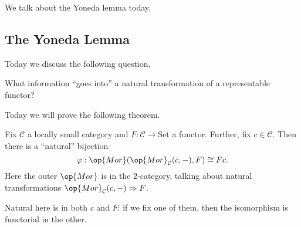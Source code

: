 
We talk about the Yoneda lemma today.

\subsection{The Yoneda Lemma}
Today we discuss the following question.
\begin{ques}
	What information ``goes into'' a natural transformation of a representable functor?
\end{ques}
Today we will prove the following theorem.
\begin{theorem}
	Fix $\mathcal C$ a locally small category and $F:\mathcal C\to\mathrm{Set}$ a functor. Further, fix $c\in\mathcal C$. Then there is a ``natural'' bijection
	\[\varphi:\op{Mor}(\op{Mor}_\mathcal C(c,-),F)\cong Fc.\]
	Here the outer $\op{Mor}$ is in the $2$-category, talking about natural transformations $\op{Mor}_\mathcal C(c,-)\Rightarrow F$.
\end{theorem}
Natural here is in both $c$ and $F$: if we fix one of them, then the isomorphism is functorial in the other.
